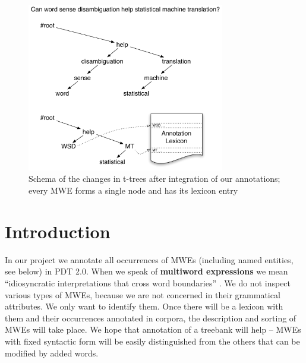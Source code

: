 \begin{figure}[htbp]
   \centering
   \includegraphics[width=3.4in]{images/stromecky.pdf}
   \caption{Schema of the changes in t-trees after integration of our annotations; every MWE forms a single node and has its lexicon entry}
   \label{fig:trees}
\end{figure}





\section{Introduction}
\label{sec:intro}
In our project we annotate all occurrences of MWEs (including named entities, see below) in PDT 2.0. 
When we speak of {\bf multiword expressions} we mean ``idiosyncratic interpretations that cross word boundaries'' \cite{sag:2002}. We do not inspect various types of MWEs, because we are not concerned in their grammatical attributes. We only want to identify them. Once there will be a lexicon with them and their occurrences annotated in corpora, the description and sorting of MWEs will take place. We hope that annotation of a treebank will help -- MWEs with fixed syntactic form will be easily distinguished from the others that can be modified by added words.

